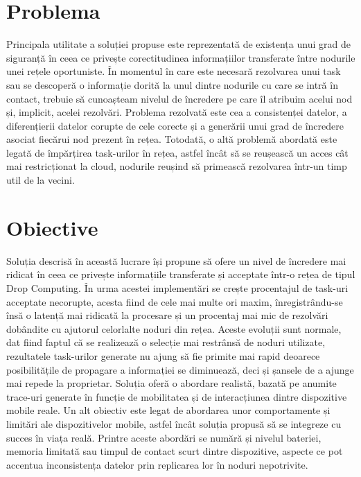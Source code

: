 \documentclass[12pt,a4paper]{report}
\begin{document}
\section{Problema} 
Principala utilitate a soluției propuse este reprezentată de existența unui grad de siguranță în ceea ce privește corectitudinea informațiilor transferate între nodurile unei rețele oportuniste. În momentul în care este necesară rezolvarea unui task sau se descoperă o informație dorită la unul dintre nodurile cu care se intră în contact, trebuie să cunoașteam nivelul de încredere pe care îl atribuim acelui nod și, implicit, acelei rezolvări. Problema rezolvată este cea a consistenței datelor, a diferențierii datelor corupte de cele corecte și a generării unui grad de încredere asociat fiecărui nod prezent în rețea. Totodată, o altă problemă abordată este legată de împărțirea task-urilor în rețea, astfel încât să se reușească un acces cât mai restricționat la cloud, nodurile reușind să primească rezolvarea într-un timp util de la vecini.

\section{Obiective}
Soluția descrisă în această lucrare își propune să ofere un nivel de încredere mai ridicat în ceea ce privește informațiile transferate și acceptate într-o rețea de tipul Drop Computing. În urma acestei implementări se crește procentajul de task-uri acceptate necorupte, acesta fiind de cele mai multe ori maxim, înregistrându-se însă o latență mai ridicată la procesare și un procentaj mai mic de rezolvări dobândite cu ajutorul celorlalte noduri din rețea. Aceste evoluții sunt normale, dat fiind faptul că se realizează o selecție mai restrânsă de noduri utilizate, rezultatele task-urilor generate nu ajung să fie primite mai rapid deoarece posibilitățile de propagare a informației se diminuează, deci și șansele de a ajunge mai repede la proprietar. Soluția oferă o abordare realistă, bazată pe anumite trace-uri generate în funcție de mobilitatea și de interacțiunea dintre dispozitive mobile reale. Un alt obiectiv este legat de abordarea unor comportamente și limitări ale dispozitivelor mobile, astfel încât soluția propusă să se integreze cu succes în viața reală. Printre aceste abordări se numără și nivelul bateriei, memoria limitată sau timpul de contact scurt dintre dispozitive, aspecte ce pot accentua inconsistența datelor prin replicarea lor în noduri nepotrivite.
\end{document}

